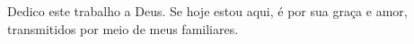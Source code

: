 \begin{dedicatoria}
   \vspace*{\fill}
   	\begin{flushright}
   \noindent
    Dedico este trabalho a Deus. Se hoje estou aqui, é por sua graça e amor, transmitidos por meio de meus familiares. 
   	\end{flushright}
\end{dedicatoria}
